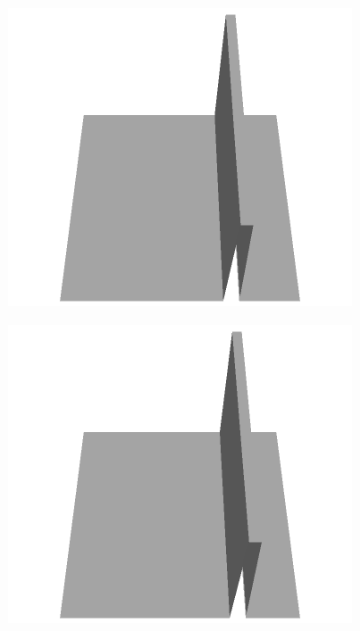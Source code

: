 \documentclass[../document.tex]{subfiles}
\begin{document}
\begin{figure}[H]
\begin{subfigure}[b]{0.24\textwidth}
    \end{subfigure}
    \begin{subfigure}[b]{0.24\textwidth}
    \includegraphics[width=\linewidth]{../img/5/custom_patches/walls_front/all/40-3d.png}
    \end{subfigure}
    \begin{subfigure}[b]{0.24\textwidth}
    \includegraphics[width=\linewidth]{../img/5/custom_patches/walls_front/all/35-3d.png}
    \end{subfigure}

\end{figure}
\end{document}
